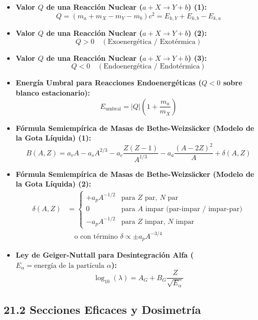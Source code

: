 \documentclass[11pt,a4paper]{article}
\begin{document}
\begin{itemize}
  \item \textbf{Valor $Q$ de una Reacción Nuclear ($a + X \to Y + b$) (1):}
  \[
    Q = (m_a + m_X - m_Y - m_b) c^2 = E_{k,Y} + E_{k,b} - E_{k,a}
  \]
  \item \textbf{Valor $Q$ de una Reacción Nuclear ($a + X \to Y + b$) (2):}
  \[
    Q > 0 \quad (\text{Exoenergética / Exotérmica})
  \]
  \item \textbf{Valor $Q$ de una Reacción Nuclear ($a + X \to Y + b$) (3):}
  \[
    Q < 0 \quad (\text{Endoenergética / Endotérmica})
  \]
  \item \textbf{Energía Umbral para Reacciones Endoenergéticas ($Q < 0$ sobre blanco estacionario):}
  \[
    E_{\text{umbral}} = |Q|\left( 1 + \frac{m_a}{m_X} \right)
  \]
  \item \textbf{Fórmula Semiempírica de Masas de Bethe-Weizsäcker (Modelo de la Gota Líquida) (1):}
  \[
    B(A, Z) = a_v A - a_s A^{2/3} - a_c \frac{Z(Z - 1)}{A^{1/3}} - a_a \frac{(A - 2Z)^2}{A} + \delta(A, Z)
  \]
  \item \textbf{Fórmula Semiempírica de Masas de Bethe-Weizsäcker (Modelo de la Gota Líquida) (2):}
  \[
    \begin{aligned}
      \delta(A, Z) &= \begin{cases}
        +a_p A^{-1/2} & \text{para } Z \text{ par, } N \text{ par} \\
        0 & \text{para } A \text{ impar (par-impar / impar-par)} \\
        -a_p A^{-1/2} & \text{para } Z \text{ impar, } N \text{ impar}
      \end{cases} \\
      &\quad \text{o con término } \delta \propto \pm a_p A^{-3/4}
    \end{aligned}
  \]
  \item \textbf{Ley de Geiger-Nuttall para Desintegración Alfa ($E_\alpha = \text{energía de la partícula } \alpha$):}
  \[
    \log_{10}(\lambda) = A_G + B_G \frac{Z}{\sqrt{E_\alpha}}
  \]
\end{itemize}

\subsection*{21.2 Secciones Eficaces y Dosimetría}
\end{document}

